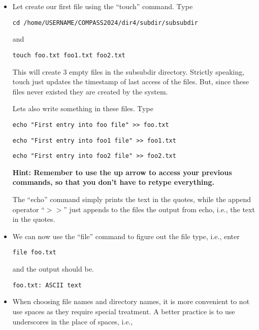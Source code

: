 \documentclass[aps,showpacs,prd,notitlepage,preprintnumbers,amsmath,amssymb,letterpaper]{revtex4}
\begin{document}
\begin{itemize}
\item Let create our first file using the ``touch'' command. Type

\begin{verbatim}
cd /home/USERNAME/COMPASS2024/dir4/subdir/subsubdir
\end{verbatim}

and

\begin{verbatim}
touch foo.txt foo1.txt foo2.txt
\end{verbatim}

This will create 3 empty files in the subsubdir directory. Strictly
speaking, touch just updates the timestamp of last access of the
files.  But, since these files never existed they are created by the
system.

Lets also write something in these files. Type

\begin{verbatim}
echo "First entry into foo file" >> foo.txt
\end{verbatim}

\begin{verbatim}
echo "First entry into foo1 file" >> foo1.txt
\end{verbatim}

\begin{verbatim}
echo "First entry into foo2 file" >> foo2.txt
\end{verbatim}

{\bf Hint: Remember to use the up arrow to access your previous
commands, so that you don't have to retype everything.}

The ``echo'' command simply prints the text in the quotes, while the
append operator ``$>>$'' just appends to the files the output from
echo, i.e., the text in the quotes.

\item We can now use the ``file'' command to figure out the file type, i.e.,
enter
  
\begin{verbatim}
file foo.txt
\end{verbatim}

and the output should be.
\begin{verbatim}
foo.txt: ASCII text
\end{verbatim}

\item When choosing file names and directory names, it is more
  convenient to not use spaces as they require special treatment. A
  better practice is to use underscores in the place of spaces, i.e.,


\end{itemize}
\end{document}
